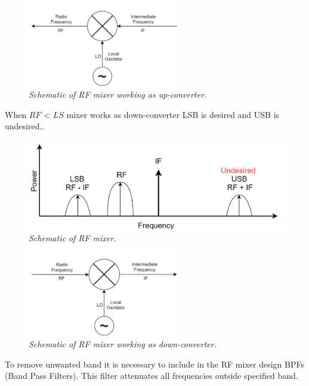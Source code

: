 \documentclass[en,printmode]{mgr}
\begin{document}
		\begin{figure}[!htb]
    		\centering
   			\includegraphics[width=0.6\textwidth]{diag/upmx.png}
    		\caption{\textit{Schematic of RF mixer working as up-converter.}}
		\end{figure}
		
		When $RF$ < $LS$ mixer works as down-converter LSB is desired and USB is undesired..
		\begin{figure}[!htb]
    		\centering
   			\includegraphics[width=\textwidth]{diag/downconv.png}
    		\caption{\textit{Schematic of RF mixer.}}
		\end{figure}
		
		\begin{figure}[!htb]
    		\centering
   			\includegraphics[width=0.6\textwidth]{diag/downmx.png}
    		\caption{\textit{Schematic of RF mixer working as down-converter.}}
		\end{figure}
		
		To remove unwanted band it is necessary to include in the RF mixer design BPFs (Band Pass Filters).
		This filter attenuates all frequencies outside specified band.
		\\
		
\end{document}
